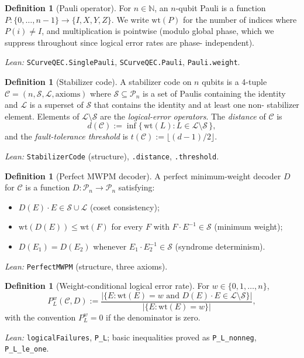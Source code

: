 \documentclass[11pt]{article}
\theoremstyle{definition}
\newtheorem{definition}[theorem]{Definition}
\theoremstyle{remark}
\begin{document}
\begin{definition}[Pauli operator]
For $n \in \mathbb{N}$, an $n$-qubit Pauli is a function
$P: \{0, \ldots, n-1\} \to \{I, X, Y, Z\}$.  We write
$\mathrm{wt}(P)$ for the number of indices where $P(i) \neq I$,
and multiplication is pointwise (modulo global phase, which we
suppress throughout since logical error rates are phase-
independent).

\emph{Lean:} \texttt{SCurveQEC.SinglePauli},
\texttt{SCurveQEC.Pauli}, \texttt{Pauli.weight}.
\end{definition}

\begin{definition}[Stabilizer code]
A stabilizer code on $n$ qubits is a 4-tuple
$\mathcal{C} = (n, \mathcal{S}, \mathcal{L}, \mathrm{axioms})$
where $\mathcal{S} \subseteq \mathcal{P}_n$ is a set of Paulis
containing the identity and $\mathcal{L}$ is a superset of
$\mathcal{S}$ that contains the identity and at least one non-
stabilizer element.  Elements of $\mathcal{L} \setminus \mathcal{S}$
are the \emph{logical-error operators}.  The \emph{distance} of
$\mathcal{C}$ is
$$d(\mathcal{C}) := \inf\{\,\mathrm{wt}(L) : L \in \mathcal{L}
\setminus \mathcal{S}\,\},$$
and the \emph{fault-tolerance threshold} is
$t(\mathcal{C}) := \lfloor (d-1)/2 \rfloor$.

\emph{Lean:} \texttt{StabilizerCode} (structure),
\texttt{.distance}, \texttt{.threshold}.
\end{definition}

\begin{definition}[Perfect MWPM decoder]
A perfect minimum-weight decoder $D$ for $\mathcal{C}$ is a
function $D : \mathcal{P}_n \to \mathcal{P}_n$ satisfying:
\begin{itemize}
\item $D(E) \cdot E \in \mathcal{S} \cup \mathcal{L}$ (coset
consistency);
\item $\mathrm{wt}(D(E)) \leq \mathrm{wt}(F)$ for every $F$ with
$F \cdot E^{-1} \in \mathcal{S}$ (minimum weight);
\item $D(E_1) = D(E_2)$ whenever $E_1 \cdot E_2^{-1} \in
\mathcal{S}$ (syndrome determinism).
\end{itemize}

\emph{Lean:} \texttt{PerfectMWPM} (structure, three axioms).
\end{definition}

\begin{definition}[Weight-conditional logical error rate]
For $w \in \{0, 1, \ldots, n\}$,
$$P_L^w(\mathcal{C}, D)
:= \frac{|\{E : \mathrm{wt}(E) = w \text{ and }
D(E) \cdot E \in \mathcal{L} \setminus \mathcal{S}\}|}
{|\{E : \mathrm{wt}(E) = w\}|},$$
with the convention $P_L^w = 0$ if the denominator is zero.

\emph{Lean:} \texttt{logicalFailures}, \texttt{P\_L};
basic inequalities proved as \texttt{P\_L\_nonneg},
\texttt{P\_L\_le\_one}.
\end{definition}
\end{document}

